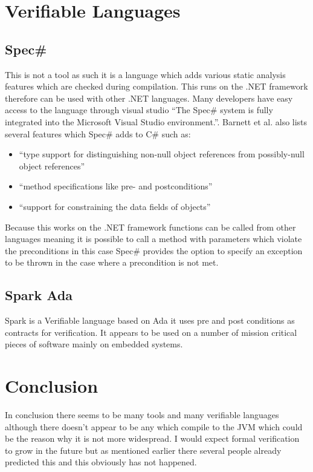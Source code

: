 \documentclass[a4paper,12pt]{scrartcl}
\begin{document}
	\section{Verifiable Languages}
	{
		\subsection{\texorpdfstring{Spec\#}{}}
		{
			This is not a tool as such it is a language which adds various static analysis features which are checked during compilation. This runs on the .NET framework therefore can be used with other .NET languages. Many developers have easy access to the language through visual studio \enquote{The Spec\# system is fully integrated into the Microsoft Visual Studio environment.}\cite{Barnett2005}. Barnett et al. also lists several features which Spec\# adds to C\# such as:
			\begin{itemize}
				\item{\enquote{type support for distinguishing non-null object references from possibly-null object references}\cite{Barnett2005}}
				\item{\enquote{method specifications like pre- and postconditions}\cite{Barnett2005}}
				\item{\enquote{support for constraining the data fields of objects}\cite{Barnett2005}}
			\end{itemize}
			Because this works on the .NET framework functions can be called from other languages meaning it is possible to call a method with parameters which violate the preconditions in this case Spec\# provides the option to specify an exception to be thrown in the case where a precondition is not met.
		}
		\subsection{Spark Ada}
		{
			Spark is a Verifiable language based on Ada it uses pre and post conditions as contracts for verification. It appears to be used on a number of mission critical pieces of software mainly on embedded systems. 
		}
	}

	\section{Conclusion}
	{
		In conclusion there seems to be many tools and many verifiable languages although there doesn't appear to be any which compile to the JVM which could be the reason why it is not more widespread. I would expect formal verification to grow in the future but as mentioned earlier there several people already predicted this and this obviously has not happened. 
	}
	
	\newpage
	
	\printbibliography[heading=bibintoc,title=References]
\end{document}
